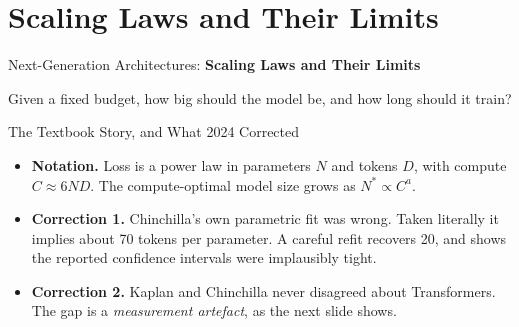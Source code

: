 \section{Scaling Laws and Their Limits}

\begin{frame}{}
    \LARGE Next-Generation Architectures: \textbf{Scaling Laws and Their Limits}

    \vspace{1em}
    \normalsize Given a fixed budget, how big should the model be, and how long should it train?
\end{frame}

\begin{frame}{The Textbook Story, and What 2024 Corrected}
    \begin{itemize}\itemsep0.5em
        \item \textbf{Notation.} Loss is a power law in parameters $N$ and tokens $D$, with compute $C\approx 6ND$. The compute-optimal model size grows as $N^*\propto C^{a}$.
        \item \textbf{Correction 1.} Chinchilla's own parametric fit was wrong. Taken literally it implies about 70 tokens per parameter. A careful refit recovers 20, and shows the reported confidence intervals were implausibly tight.
        \item \textbf{Correction 2.} Kaplan and Chinchilla never disagreed about Transformers. The gap is a \emph{measurement artefact}, as the next slide shows.
    \end{itemize}
    \vspace{0.2em}
\end{frame}

